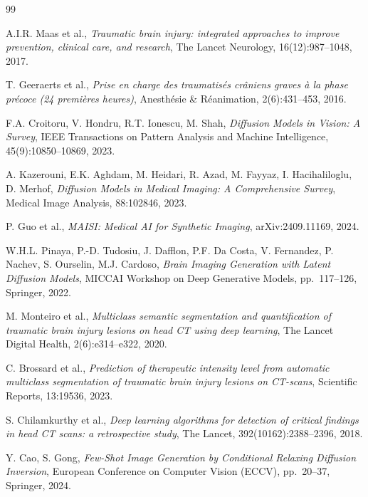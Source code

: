 \documentclass[11pt,a4paper]{article}
\begin{document}
\renewcommand{\refname}{Références}
\begin{thebibliography}{99}

A.I.R. Maas et al.,
\emph{Traumatic brain injury: integrated approaches to improve prevention, clinical care, and research},
The Lancet Neurology, 16(12):987--1048, 2017.

T. Geeraerts et al.,
\emph{Prise en charge des traumatisés crâniens graves à la phase précoce (24 premières heures)},
Anesthésie \& Réanimation, 2(6):431--453, 2016.

F.A. Croitoru, V. Hondru, R.T. Ionescu, M. Shah,
\emph{Diffusion Models in Vision: A Survey},
IEEE Transactions on Pattern Analysis and Machine Intelligence, 45(9):10850--10869, 2023.

A. Kazerouni, E.K. Aghdam, M. Heidari, R. Azad, M. Fayyaz, I. Hacihaliloglu, D. Merhof,
\emph{Diffusion Models in Medical Imaging: A Comprehensive Survey},
Medical Image Analysis, 88:102846, 2023.

P. Guo et al.,
\emph{MAISI: Medical AI for Synthetic Imaging},
arXiv:2409.11169, 2024.

W.H.L. Pinaya, P.-D. Tudosiu, J. Dafflon, P.F. Da Costa, V. Fernandez, P. Nachev, S. Ourselin, M.J. Cardoso,
\emph{Brain Imaging Generation with Latent Diffusion Models},
MICCAI Workshop on Deep Generative Models, pp.~117--126, Springer, 2022.

M. Monteiro et al.,
\emph{Multiclass semantic segmentation and quantification of traumatic brain injury lesions on head CT using deep learning},
The Lancet Digital Health, 2(6):e314--e322, 2020.

C. Brossard et al.,
\emph{Prediction of therapeutic intensity level from automatic multiclass segmentation of traumatic brain injury lesions on CT-scans},
Scientific Reports, 13:19536, 2023.

S. Chilamkurthy et al.,
\emph{Deep learning algorithms for detection of critical findings in head CT scans: a retrospective study},
The Lancet, 392(10162):2388--2396, 2018.

Y. Cao, S. Gong,
\emph{Few-Shot Image Generation by Conditional Relaxing Diffusion Inversion},
European Conference on Computer Vision (ECCV), pp.~20--37, Springer, 2024.


\end{thebibliography}
\end{document}
